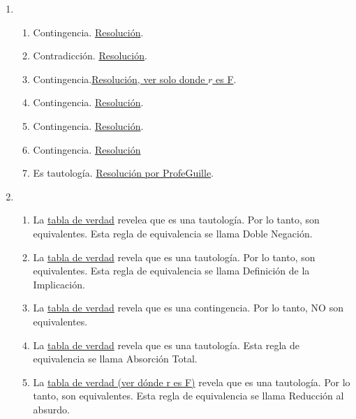 \documentclass[a4paper]{article}
\newcommand{\exercise}{\item}
\newcommand{\then}{\to}
\begin{document}
\begin{enumerate}
\begin{enumerate} [label=(\alph*)]
		\item $( p\then q ) \land ( r\then \neg q )$ con $p$:"\textit{Te tomas el 324}", $q$:"\textit{Te deja cerca de la UNQ}" y $p$:"\textit{Te tomás el 65}".  
\end{enumerate}\exercise\begin{enumerate} [label=(\alph*)]		\item Contingencia. \href{https://www.wolframalpha.com/input?i=%28not+p+or+q%29+and+not+q}{Resolución}.
		\item Contradicción. \href{https://www.wolframalpha.com/input?i=truth+table+of%3A+p+and+not+p}{Resolución}.
		\item Contingencia.\href{https://www.wolframalpha.com/input?i=p+and+r+or++q}{Resolución, ver solo donde $r$ es F}.
		\item Contingencia. \href{https://www.wolframalpha.com/input?i=%28p+%3D%3E+q%29+%3D%3E+r}{Resolución}.
		\item Contingencia. \href{https://www.wolframalpha.com/input?i=p+%3C%3D%3E+%28q+xor++r%29}{Resolución}.
		\item Contingencia. \href{https://www.wolframalpha.com/input?i=%28p+nand+q%29+nor+r}{Resolución}
		\item Es tautología. \href{https://youtu.be/k-amMQR3oMc}{Resolución por ProfeGuille}.
\end{enumerate}\exercise\begin{enumerate} [label=(\alph*)]		\item La \href{https://www.wolframalpha.com/input?i=truth+table%3A+not+%28not+p%29+%3C%3D%3E+p}{tabla de verdad} revelea que es una tautología. Por lo tanto, son equivalentes. Esta regla de equivalencia se llama Doble Negación.
		\item La \href{https://www.wolframalpha.com/input?i=%28p+%3D%3E+q%29+%3C%3D%3E+not+q+%3D%3E+not+p}{tabla de verdad} revela que es una tautología. Por lo tanto, son equivalentes. Esta regla de equivalencia se llama Definición de la Implicación.
		\item La \href{https://www.wolframalpha.com/input?i=%28p+%3D%3E+q%29+%3C%3D%3E+%28not+p+%3D%3E+not+q%29}{tabla de verdad} revela que es una contingencia. Por lo tanto, NO son equivalentes.
		\item La \href{https://www.wolframalpha.com/input?i=%28p+and+%28p+or++q%29%29+%3C%3D%3E++p}{tabla de verdad} revela que es una tautología. Esta regla de equivalencia se llama Absorción Total.
		\item La \href{https://www.wolframalpha.com/input?i=%28p+%3D%3E+q%29+%3C%3D%3E+%28%28p+and+not+q%29+%3D%3E+r%29}{tabla de verdad (ver dónde r es F)} revela que es una tautología. Por lo tanto, son equivalentes. Esta regla de equivalencia se llama Reducción al absurdo.

\end{enumerate}
\end{enumerate}
\end{document}
